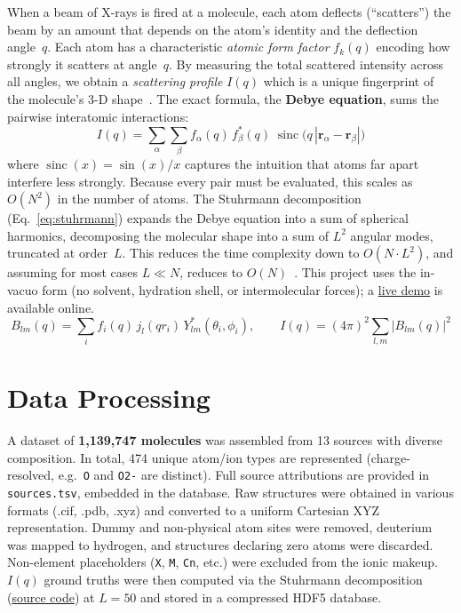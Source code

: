 \documentclass[final]{article}
\DeclareMathOperator{\sinc}{sinc}
\begin{document}
When a beam of X-rays is fired at a molecule, each atom deflects (``scatters'') the beam by an
amount that depends on the atom's identity and the deflection angle~$q$. Each atom has a
characteristic \emph{atomic form factor} $f_k(q)$ encoding how strongly it scatters at
angle~$q$. By measuring the total scattered intensity across all angles, we obtain a
\emph{scattering profile} $I(q)$ which is a unique fingerprint of the molecule's 3-D shape~\cite{debye}. The exact formula, 
the \textbf{Debye equation}, sums the pairwise interatomic interactions:
\begin{equation}
    I(q) = \sum_{\alpha}\sum_{\beta}
    f_{\alpha}(q)\,f^{*}_{\beta}(q)\;\sinc\!\bigl(q\,|\mathbf{r}_{\alpha} - \mathbf{r}_{\beta}|\bigr)
    \label{eq:debye}
\end{equation}
where $\sinc(x)=\sin(x)/x$ captures the intuition that atoms far apart interfere less strongly. Because every pair must be evaluated, 
this scales as $O(N^2)$ in the number of atoms. The Stuhrmann decomposition (Eq.~\ref{eq:stuhrmann}) expands the Debye equation into a sum of spherical harmonics, decomposing the
molecular shape into a sum of \(L^2\) angular modes, truncated at order~$L$. This reduces the time complexity down to $O(N \cdot L^2)$, 
and assuming for most cases \(L \ll N\), reduces to $O(N)$~\cite{Stuhrmann}.
This project uses the in-vacuo form (no solvent, hydration shell, or intermolecular forces); a \href{https://noshou.github.io/APS360/}{live demo} is available online.
\begin{equation}
    B_{lm}(q) = \sum_i f_i(q)\,j_l(qr_i)\,Y^*_{lm}(\theta_i,\phi_i),
    \qquad
    I(q) = (4\pi)^2 \sum_{l,m} |B_{lm}(q)|^2
    \label{eq:stuhrmann}
\end{equation}


\section{Data Processing}

A dataset of \textbf{1,139,747 molecules} was assembled from 13 sources with diverse composition.
In total, 474 unique atom/ion types are represented (charge-resolved, e.g.\ \texttt{O} and
\texttt{O2-} are distinct). Full source attributions are provided in \texttt{sources.tsv},
embedded in the database. 
Raw structures were obtained in various formats (.cif, .pdb, .xyz\@) and converted to a
uniform Cartesian XYZ representation. Dummy and non-physical atom sites were removed,
deuterium was mapped to hydrogen, and structures declaring zero atoms were discarded.
Non-element placeholders (\texttt{X}, \texttt{M}, \texttt{Cn}, etc.) were excluded from
the ionic makeup. $I(q)$ ground truths were then computed via the Stuhrmann decomposition 
(\href{https://github.com/noshou/APS360/tree/main/Scattering}{source code})
at $L{=}50$  and stored in a compressed HDF5 database.
\end{document}
